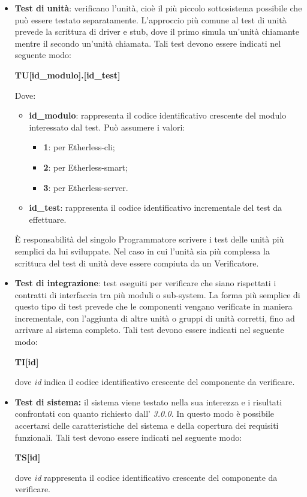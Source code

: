         \begin{itemize}
          \item \textbf{Test di unità}: verificano l'unità, cioè il più piccolo sottosistema possibile che può essere testato separatamente. L'approccio più comune al test di unità prevede la scrittura di driver e stub, dove il primo simula un'unità chiamante mentre il secondo un'unità chiamata. Tali test devono essere indicati nel seguente modo: 
          \begin{center}
          	\textbf{TU[id\_modulo].[id\_test]}
          \end{center}
      	  Dove:
      	  \begin{itemize}
      	  	\item \textbf{id\_modulo}: rappresenta il codice identificativo crescente del modulo interessato dal test. Può assumere i valori:
        	\begin{itemize}
        		\item{\textbf{1}: per Etherless-cli;}
        		\item{\textbf{2}: per Etherless-smart;}
        		\item{\textbf{3}: per Etherless-server.}
        	\end{itemize}
      	  	\item \textbf{id\_test}: rappresenta il codice identificativo incrementale del test da effettuare.
      	  \end{itemize}
      	  È responsabilità del singolo Programmatore scrivere i test delle unità più semplici da lui sviluppate. Nel caso in cui l'unità sia più complessa la scrittura del test di unità deve essere compiuta da un Verificatore. 
        
          \item \textbf{Test di integrazione}: test eseguiti per verificare che siano rispettati i contratti di interfaccia tra più moduli o sub-system. La forma più semplice di questo tipo di test prevede che le componenti vengano verificate in maniera incrementale, con l'aggiunta di altre unità o gruppi di unità corretti, fino ad arrivare al sistema completo. Tali test devono essere indicati nel seguente modo: 
          \begin{center}
          	\textbf{TI[id]}
          \end{center}
      		dove \textit{id} indica il codice identificativo crescente del componente da verificare. 
         
			\item \textbf{Test di sistema:} il sistema viene testato nella sua interezza e i  risultati confrontati con quanto richiesto dall'\AdR{} \textit{3.0.0}. In questo modo è possibile accertarsi delle caratteristiche del sistema e della copertura dei requisiti funzionali. Tali test devono essere indicati nel seguente modo: 
			\begin{center}
				\textbf{TS[id]}
			\end{center}
			dove \textit{id} rappresenta il codice identificativo crescente del componente da verificare. 
         

\end{itemize}
